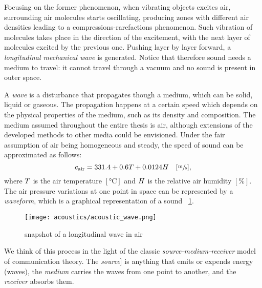 Focusing on the former phenomenon, when vibrating objects excites air, surrounding air molecules starts oscillating,
producing zones with different air densities leading to a compressions-rarefactions phenomenon.
Such vibration of molecules takes place in the direction of the excitement, with the next layer of molecules excited by the previous one.
Pushing layer by layer forward, a \textit{longitudinal mechanical wave} is generated.
Notice that therefore sound needs a medium to travel: it cannot travel through a vacuum and no sound is present in outer space.


A \textit{wave} is a disturbance that propagates though a medium, which can be solid, liquid or gaseous.
The propagation happens at a certain speed which depends on the physical properties of the medium, such as its density and composition.
The medium assumed throughout the entire thesis is air, although extensions of the developed methods to other media could be envisioned.
Under the fair assumption of air being homogeneous and steady,
the speed of sound can be approximated as follows:
\begin{equation}
    c_\text{air} =  331.4 + 0.6T + 0.0124H \hspace{1em} [\sfrac{\si{\metre}}{\si{\second}}]
    ,
\end{equation}
where $T$ is the air temperature $[\si{\celsius}]$ and $H$ is the relative air humidity $[\%]$.
The air pressure variations at one point in space can be represented by a \textit{waveform}, which is a graphical representation of a sound
~\cref{fig:acoustics:acoustics_wave}.
\begin{figure}[h]
    \centering
    \texttt{[image: acoustics/acoustic\_wave.png]}
    \caption{snapshot of a longitudinal wave in air}
    \label{fig:acoustics:acoustics_wave}
\end{figure}

We think of this process in the light of the classic \textit{source-medium-receiver} model of communication theory.
The \textit{source}] is anything that emits or expends energy (waves),
the \textit{medium} carries the waves from one point to another, and the \textit{receiver} absorbs them.

